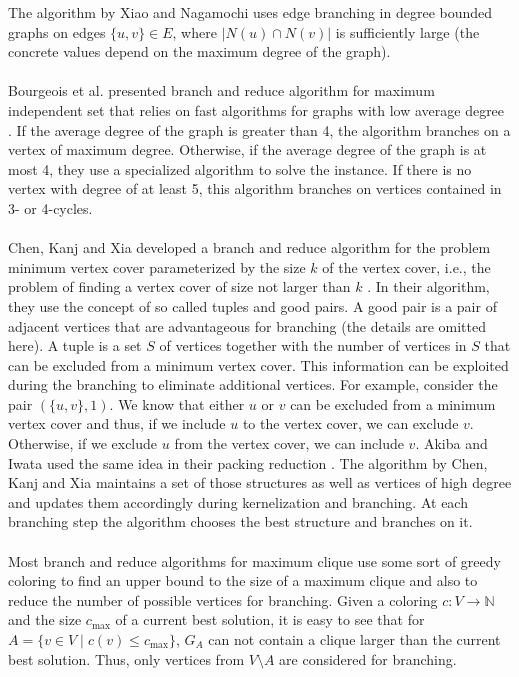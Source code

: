 \documentclass[]{article}
\begin{document}
The algorithm by Xiao and Nagamochi uses edge branching in degree bounded graphs on edges $\{u,v\}\in E$, where $|N(u)\cap N(v)|$ is sufficiently large (the concrete values depend on the maximum degree of the graph). \paragraph{}
Bourgeois et al. presented branch and reduce algorithm for maximum independent set that relies on fast algorithms for graphs with low average degree \cite{Bourgeois}. If the average degree of the graph is greater than 4, the algorithm branches on a vertex of maximum degree. Otherwise, if the average degree of the graph is at most 4, they use a specialized algorithm to solve the instance. If there is no vertex with degree of at least 5, this algorithm branches on vertices contained in 3- or 4-cycles.\paragraph{}
Chen, Kanj and Xia developed a branch and reduce algorithm for the problem minimum vertex cover parameterized by the size $k$ of the vertex cover, i.e., the problem of finding a vertex cover of size not larger than $k$ \cite{ChenXiaKanj}. In their algorithm, they use the concept of so called tuples and good pairs. A good pair is a pair of adjacent vertices that are advantageous for branching (the details are omitted here). A tuple is a set $S$ of vertices together with the number of vertices in $S$ that can be excluded from a minimum vertex cover. This information can be exploited during the branching to eliminate additional vertices. For example, consider the pair $(\{u,v\}, 1)$. We know that either $u$ or $v$ can be excluded from a minimum vertex cover and thus, if we include $u$ to the vertex cover, we can exclude $v$. Otherwise, if we exclude $u$ from the vertex cover, we can include $v$. Akiba and Iwata used the same idea in their packing reduction \cite{AkibaIwata}. The algorithm by Chen, Kanj and Xia maintains a set of those structures as well as vertices of high degree and updates them accordingly during kernelization and branching. At each branching step the algorithm chooses the best structure and branches on it.\paragraph{}\newpage
Most branch and reduce algorithms for maximum clique use some sort of greedy coloring to find an upper bound to the size of a maximum clique and also to reduce the number of possible vertices for branching. Given a coloring $c:V \rightarrow \mathbb{N}$ and the size $c_\text{max}$ of a current best solution, it is easy to see that for $A = \{v\in V \;|\; c(v)\leq c_\text{max}\}$, $G_A$ can not contain a clique larger than the current best solution. Thus, only vertices from $V\setminus A$ are considered for branching.
\end{document}
